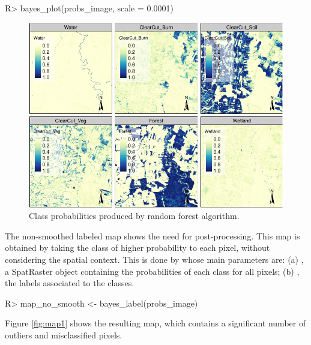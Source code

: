 \documentclass[
  shortnames]{jss}
\begin{document}
\begin{CodeChunk}
\begin{CodeInput}
R> bayes_plot(probs_image, scale = 0.0001)
\end{CodeInput}
\begin{figure}[h]

{\centering \includegraphics{Bayesian_smoothing_JSS_files/figure-latex/pcube-1} 

}

\caption[Class probabilities produced by random forest algorithm]{Class probabilities produced by random forest algorithm.}\label{fig:pcube}
\end{figure}
\end{CodeChunk}

The non-smoothed labeled map shows the need for post-processing. This map is obtained by taking the class of higher probability to each pixel, without considering the spatial context. This is done by  whose main parameters are: (a) , a SpatRaster object containing the probabilities of each class for all pixels; (b) , the labels associated to the classes.

\begin{CodeChunk}
\begin{CodeInput}
R> map_no_smooth <- bayes_label(probs_image)
\end{CodeInput}
\end{CodeChunk}

Figure \ref{fig:map1} shows the resulting map, which contains a significant number of outliers and misclassified pixels.
\end{document}
